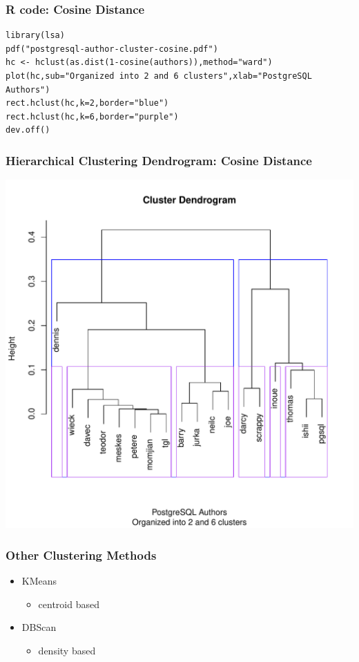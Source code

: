 \documentclass[bigger]{beamer}
\begin{document}
\begin{frame}[fragile]
\frametitle{R code: Cosine Distance}
\label{sec-1-10}


\begin{verbatim}
library(lsa)
pdf("postgresql-author-cluster-cosine.pdf")
hc <- hclust(as.dist(1-cosine(authors)),method="ward")
plot(hc,sub="Organized into 2 and 6 clusters",xlab="PostgreSQL Authors")
rect.hclust(hc,k=2,border="blue")
rect.hclust(hc,k=6,border="purple")
dev.off()
\end{verbatim}
\end{frame}
\begin{frame}
\frametitle{Hierarchical Clustering Dendrogram: Cosine Distance}
\label{sec-1-11}

   \includegraphics[height=0.8\textheight]{./postgresql-author-cluster-cosine.pdf}        
\end{frame}
\begin{frame}
\frametitle{Other Clustering Methods}
\label{sec-1-12}


\begin{itemize}
\item KMeans
\begin{itemize}
\item centroid based
\end{itemize}
\item DBScan
\begin{itemize}
\item density based
\end{itemize}
\end{itemize}
\end{frame}
\end{document}
